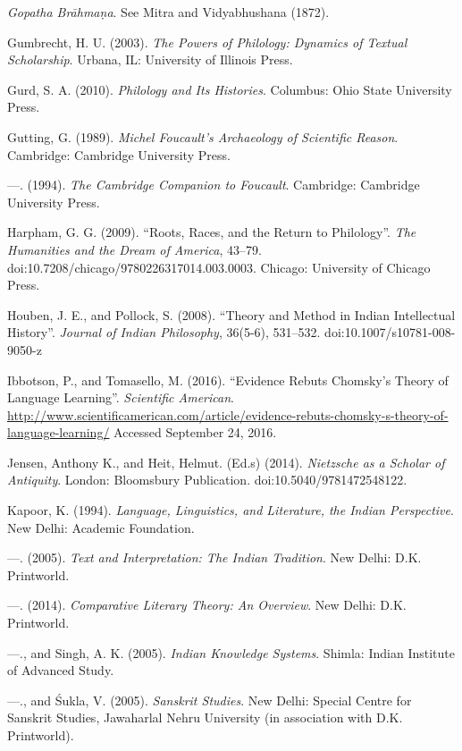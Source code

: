 \begin{thebibliography}{99}
  \textit{Gopatha Brāhmaṇa}. See Mitra and Vidyabhushana (1872).

  Gumbrecht, H. U. (2003). \textit{The Powers of Philology: Dynamics of Textual Scholarship}. Urbana, IL: University of Illinois Press.

  Gurd, S. A. (2010). \textit{Philology and Its Histories}. Columbus: Ohio State University Press.

  Gutting, G. (1989). \textit{Michel Foucault's Archaeology of Scientific Reason}. Cambridge: Cambridge University Press.

  —. (1994). \textit{The Cambridge Companion to Foucault}. Cambridge: Cambridge University Press.

  Harpham, G. G. (2009). “Roots, Races, and the Return to Philology”. \textit{The Humanities and the Dream of America}, 43--79. doi:10.7208/chicago/9780226317014.003.0003. Chicago: University of Chicago Press.

  Houben, J. E., and Pollock, S. (2008). “Theory and Method in Indian Intellectual History”. \textit{Journal of Indian Philosophy}, 36(5-6), 531--532. doi:10.1007/s10781-008-9050-z

  Ibbotson, P., and Tomasello, M. (2016). “Evidence Rebuts Chomsky's Theory of Language Learning”. \textit{Scientific American}. \url{http://www.scientificamerican.com/article/evidence-rebuts-chomsky-s-theory-of-language-learning/} Accessed September 24, 2016.

  Jensen, Anthony K., and Heit, Helmut. (Ed.s) (2014). \textit{Nietzsche as a Scholar of Antiquity}. London: Bloomsbury Publication. doi:10.5040/9781472548122.

  Kapoor, K. (1994). \textit{Language, Linguistics, and Literature, the Indian Perspective}. New Delhi: Academic Foundation.

  —. (2005). \textit{Text and Interpretation: The Indian Tradition}. New Delhi: D.K. Printworld.

  —. (2014). \textit{Comparative Literary Theory: An Overview}. New Delhi: D.K. Printworld.

  —., and Singh, A. K. (2005). \textit{Indian Knowledge Systems}. Shimla: Indian Institute of Advanced Study.

  —., and Śukla, V. (2005). \textit{Sanskrit Studies}. New Delhi: Special Centre for Sanskrit Studies, Jawaharlal Nehru University (in association with D.K. Printworld).


\end{thebibliography}
